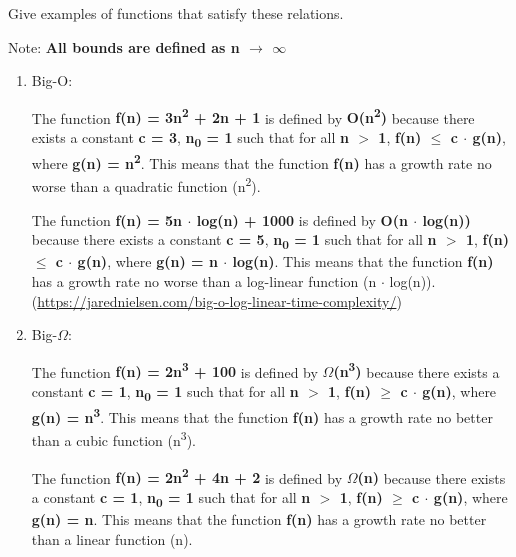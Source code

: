 \documentclass{article}
\begin{document}
\smallskip

\noindent Give examples of functions that satisfy these relations.

\medskip Note: \textbf{All bounds are defined as n $\rightarrow$ $\infty$ }

\smallskip

\begin{enumerate}

    \item Big-O: \\
        
        \smallskip

        The function \textbf{f(n) = 3n\textsuperscript{2} + 2n + 1} is defined by 
        \textbf{O(n\textsuperscript{2})} because there exists a constant \textbf{c = 3}, 
        \textbf{n\textsubscript{0} = 1} such that for all 
        \textbf{n $>$ 1}, \textbf{ f(n) $\le$ c $\cdot$ g(n)}, where 
        \textbf{g(n) = n\textsuperscript{2}}. This means that the function \textbf{f(n)} has a
        growth rate no worse than a quadratic function (n\textsuperscript{2}).

        The function \textbf{f(n) = 5n $\cdot$ log(n) + 1000} is defined by 
        \textbf{O(n $\cdot$ log(n))} because there exists a constant \textbf{c = 5}, 
        \textbf{n\textsubscript{0} = 1} such that for all \textbf{n $>$ 1}, 
        \textbf{f(n) $\le$ c $\cdot$ g(n)}, where \textbf{g(n) = n $\cdot$ log(n)}. This means 
        that the function \textbf{f(n)} has a growth rate no worse than a log-linear function 
        (n $\cdot$ log(n)). \\

        (\url{https://jarednielsen.com/big-o-log-linear-time-complexity/})


        \smallskip
    
    \item Big-$\Omega$: \\
    
        \smallskip

        The function \textbf{f(n) = 2n\textsuperscript{3} + 100} is defined by
        \textbf{$\Omega$(n\textsuperscript{3})} because there exists a constant \textbf{c = 1},
        \textbf{n\textsubscript{0} = 1} such that for all \textbf{n $>$ 1}, \textbf{f(n) $\ge$
        c $\cdot$ g(n)}, where \textbf{g(n) = n\textsuperscript{3}}. This means that the function
        \textbf{f(n)} has a growth rate no better than a cubic function (n\textsuperscript{3}).

        The function \textbf{f(n) = 2n\textsuperscript{2} + 4n + 2} is defined by
        \textbf{$\Omega$(n)} because there exists a constant \textbf{c = 1},
        \textbf{n\textsubscript{0} = 1} such that for all \textbf{n $>$ 1}, \textbf{f(n) $\ge$
        c $\cdot$ g(n)}, where \textbf{g(n) = n}. This means that the function
        \textbf{f(n)} has a growth rate no better than a linear function (n). \\


\end{enumerate}
\end{document}

